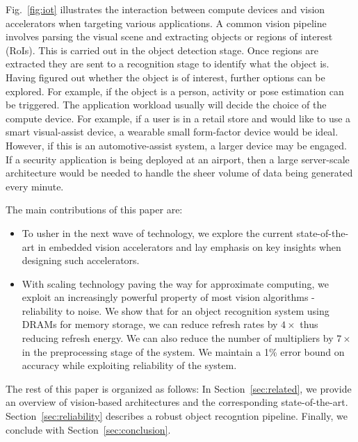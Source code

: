 Fig.~\ref{fig:iot} illustrates the interaction between compute devices and vision accelerators when targeting various applications. A common vision pipeline involves parsing the visual scene and extracting objects or regions of interest (RoIs). This is 
carried out in the object detection stage. Once regions are extracted they are sent to a recognition stage to identify 
what the object is. Having figured out whether the object is of interest, further options can be explored. For example, if the 
object is a person, activity or pose estimation can be triggered. The application workload usually will decide the choice of 
the compute device. For example, if a user is in a retail store and would like to use a smart visual-assist device, a 
wearable small form-factor device would be ideal. However, if this is an automotive-assist system, a larger device may be 
engaged. If a security application is being deployed at an airport, then a large server-scale architecture would be needed to
handle the sheer volume of data being generated every minute.

The main contributions of this paper are:
\begin{itemize}
\item To usher in the next wave of technology, we explore the current state-of-the-art in 
embedded vision accelerators and lay emphasis on key insights when designing such accelerators.
\item With scaling technology paving the way for approximate computing, we exploit an increasingly powerful property of most vision algorithms - reliability to noise. 
We show that for an object recognition system using DRAMs for memory storage, we can reduce refresh rates by $4\times$ thus reducing refresh energy. We can also reduce the number of multipliers by $7\times$ in the preprocessing stage of the system. We maintain a 1\% error bound on accuracy while exploiting reliability of the system.
\end{itemize}

The rest of this paper is organized as follows:
In Section~\ref{sec:related}, we provide an overview of vision-based architectures and the corresponding state-of-the-art.
Section~\ref{sec:reliability} describes a robust object recogntion pipeline.
Finally, we conclude with Section~\ref{sec:conclusion}.
